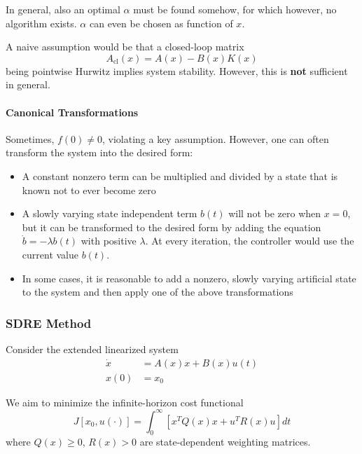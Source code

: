In general, also an optimal $\alpha$ must be found somehow, for which however, no algorithm exists. $\alpha$ can even be chosen as function of $x$.

\newpar{}

A naive assumption would be that a closed-loop matrix
\begin{equation*}
    A_{\text{cl}}(x) = A(x) - B(x) K(x)
\end{equation*}
being pointwise Hurwitz implies system stability. However, this is \textbf{not} sufficient in general.

\paragraph{Canonical Transformations}

Sometimes, $f(0) \neq 0$, violating a key assumption. However, one can often transform the system into the desired form:
\begin{itemize}
    \item A constant nonzero term can be multiplied and divided by a state that is known not to ever become zero
    \item A slowly varying state independent term $b(t)$ will not be zero when $x=0$, but it can be transformed to the desired form by adding the equation $\dot{b} = -\lambda b(t)$ with positive $\lambda$. At every iteration, the controller would use the current value $b(t)$.
    \item In some cases, it is reasonable to add a nonzero, slowly varying artificial state to the system and then apply one of the above transformations
\end{itemize}

\subsubsection{SDRE Method}

Consider the extended linearized system
\begin{align*}
    \dot{x} & = A(x) x + B(x) u(t) \\
    x(0)    & = x_0
\end{align*}

We aim to minimize the infinite-horizon cost functional
\begin{equation*}
    J[x_0, u(\cdot)] = \int_0^{\infty} \left[ x^T Q(x) x + u^T R(x) u \right] dt
\end{equation*}
where $Q(x) \geq 0$, $R(x) > 0$ are state-dependent weighting matrices.

